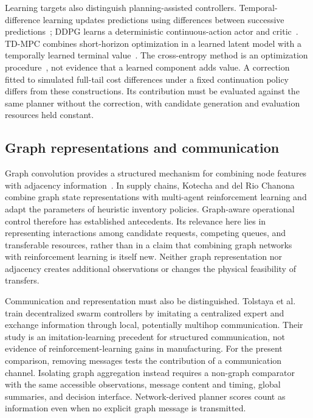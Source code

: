 Learning targets also distinguish planning-assisted controllers. Temporal-difference learning updates predictions using differences between successive predictions~\cite{Sutton1988}; DDPG learns a deterministic continuous-action actor and critic~\cite{Lillicrap2016}. TD-MPC combines short-horizon optimization in a learned latent model with a temporally learned terminal value~\cite{Hansen2022}. The cross-entropy method is an optimization procedure~\cite{DeBoer2005}, not evidence that a learned component adds value. A correction fitted to simulated full-tail cost differences under a fixed continuation policy differs from these constructions. Its contribution must be evaluated against the same planner without the correction, with candidate generation and evaluation resources held constant.

\subsection{Graph representations and communication}
Graph convolution provides a structured mechanism for combining node features with adjacency information~\cite{Kipf2017}. In supply chains, Kotecha and del Rio Chanona~\cite{Kotecha2025GNNMARL} combine graph state representations with multi-agent reinforcement learning and adapt the parameters of heuristic inventory policies. Graph-aware operational control therefore has established antecedents. Its relevance here lies in representing interactions among candidate requests, competing queues, and transferable resources, rather than in a claim that combining graph networks with reinforcement learning is itself new. Neither graph representation nor adjacency creates additional observations or changes the physical feasibility of transfers.

Communication and representation must also be distinguished. Tolstaya et al.~\cite{Tolstaya2020} train decentralized swarm controllers by imitating a centralized expert and exchange information through local, potentially multihop communication. Their study is an imitation-learning precedent for structured communication, not evidence of reinforcement-learning gains in manufacturing. For the present comparison, removing messages tests the contribution of a communication channel. Isolating graph aggregation instead requires a non-graph comparator with the same accessible observations, message content and timing, global summaries, and decision interface. Network-derived planner scores count as information even when no explicit graph message is transmitted.

